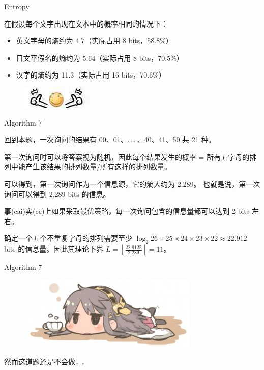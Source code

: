 \documentclass[UTF8]{beamer}
\begin{document}
\begin{frame}{Entropy}

在假设每个文字出现在文本中的概率相同的情况下：
\begin{itemize}
    \item 英文字母的熵约为 4.7（实际占用 8 bits，58.8\%）
    \item 日文平假名的熵约为 5.64（实际占用 8 bits，70.5\%）
    \item 汉字的熵约为 11.3（实际占用 16 bits，70.6\%）
\end{itemize}
\pause
\begin{figure}[h]\centering
\includegraphics[scale=0.028]{uu.jpg}
\end{figure}

\end{frame}

\begin{frame}{Algorithm 7}

回到本题，一次询问的结果有 00、01、……、40、41、50 共 21 种。

\pause
第一次询问时可以将答案视为随机，因此每个结果发生的概率 = %
所有五字母的排列中能产生该结果的排列数量/所有这样的排列数量。

\pause
可以得到，第一次询问作为一个信息源，它的熵大约为 2.289。%
也就是说，第一次询问可以得到 2.289 bits 的信息。

事(cai)实(ce)上如果采取最优策略，每一次询问包含的信息量都可以达到 2 bits 左右。

\pause
确定一个五个不重复字母的排列需要至少 %
$\log_{2} 26 \times 25 \times 24 \times 23 \times 22 \approx 22.912$ %
bits 的信息量。因此其理论下界 $L = \left\lfloor \frac{22.9125}{2.289} \right\rfloor = 11$。

\end{frame}

\begin{frame}{Algorithm 7}

\begin{figure}[h]\centering
\includegraphics[scale=0.5]{vv.jpg}
\end{figure}

然而这道题还是不会做……

\end{frame}
\end{document}
